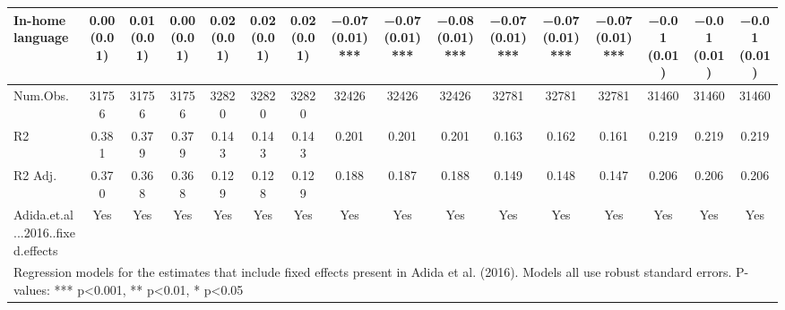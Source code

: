 \begin{table}[H]
\begin{tabular}[t]{lccccccccccccccc}
In-home language & \num{0.00} (\num{0.01}) & \num{0.01} (\num{0.01}) & \num{0.00} (\num{0.01}) & \num{0.02} (\num{0.01}) & \num{0.02} (\num{0.01}) & \num{0.02} (\num{0.01}) & \num{-0.07} (\num{0.01})*** & \num{-0.07} (\num{0.01})*** & \num{-0.08} (\num{0.01})*** & \num{-0.07} (\num{0.01})*** & \num{-0.07} (\num{0.01})*** & \num{-0.07} (\num{0.01})*** & \num{-0.01} (\num{0.01}) & \num{-0.01} (\num{0.01}) & \num{-0.01} (\num{0.01})\\
\midrule
Num.Obs. & \num{31756} & \num{31756} & \num{31756} & \num{32820} & \num{32820} & \num{32820} & \num{32426} & \num{32426} & \num{32426} & \num{32781} & \num{32781} & \num{32781} & \num{31460} & \num{31460} & \num{31460}\\
R2 & \num{0.381} & \num{0.379} & \num{0.379} & \num{0.143} & \num{0.143} & \num{0.143} & \num{0.201} & \num{0.201} & \num{0.201} & \num{0.163} & \num{0.162} & \num{0.161} & \num{0.219} & \num{0.219} & \num{0.219}\\
R2 Adj. & \num{0.370} & \num{0.368} & \num{0.368} & \num{0.129} & \num{0.128} & \num{0.129} & \num{0.188} & \num{0.187} & \num{0.188} & \num{0.149} & \num{0.148} & \num{0.147} & \num{0.206} & \num{0.206} & \num{0.206}\\
Adida.et.al...2016..fixed.effects & Yes & Yes & Yes & Yes & Yes & Yes & Yes & Yes & Yes & Yes & Yes & Yes & Yes & Yes & Yes\\
\bottomrule
\multicolumn{16}{l}{\rule{0pt}{1em}Regression models for the estimates that include fixed effects present in Adida et al. (2016). Models all use robust standard errors. P-values: *** p<0.001, ** p<0.01, * p<0.05}\\
\end{tabular}
\end{table}
